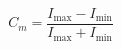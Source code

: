 \documentclass[../main.tex]{subfiles}%
\begin{document}
%
    \Xequation%
    \begin{equation}%
        C_m = \dfrac{I_\textrm{max}-I_\textrm{min}}{I_\textrm{max}+I_\textrm{min}}%
        \label{eq:contrast-michelson}%
    \end{equation}%
\end{document}
